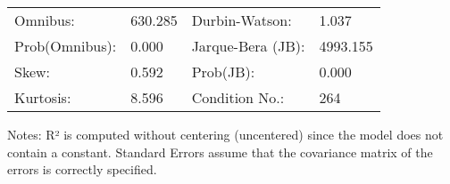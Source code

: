 \begin{table}
\begin{center}
\begin{tabular}{llll}
\hline
Omnibus:       & 630.285 & Durbin-Watson:    & 1.037     \\
Prob(Omnibus): & 0.000   & Jarque-Bera (JB): & 4993.155  \\
Skew:          & 0.592   & Prob(JB):         & 0.000     \\
Kurtosis:      & 8.596   & Condition No.:    & 264       \\
\hline
\end{tabular}
\end{center}
\end{table}
\bigskip
Notes: \newline 
[1] R² is computed without centering (uncentered) since the                 model does not contain a constant. \newline 
[2] Standard Errors assume that the covariance matrix of the errors is correctly specified.